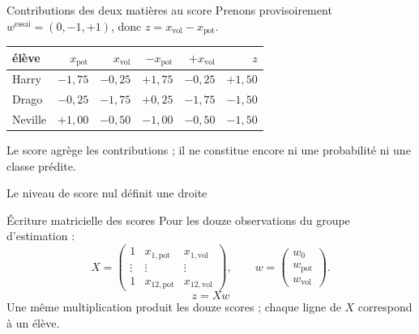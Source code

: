 \begin{frame}[t]{Contributions des deux matières au score}
  \centering
  Prenons provisoirement \(w^{\mathrm{essai}}=(0,-1,+1)\), donc
  \(z=x_{\mathrm{vol}}-x_{\mathrm{pot}}\).
  \vspace{3mm}
  \renewcommand{\arraystretch}{1.25}
  \begin{tabular}{lrrrrr}
    \toprule
    élève & $x_{\mathrm{pot}}$ & $x_{\mathrm{vol}}$ &
      $-x_{\mathrm{pot}}$ & $+x_{\mathrm{vol}}$ & $z$\\
    \midrule
    Harry   & $-1{,}75$ & $-0{,}25$ & $+1{,}75$ & $-0{,}25$ & $+1{,}50$\\
    Drago   & $-0{,}25$ & $-1{,}75$ & $+0{,}25$ & $-1{,}75$ & $-1{,}50$\\
    Neville & $+1{,}00$ & $-0{,}50$ & $-1{,}00$ & $-0{,}50$ & $-1{,}50$\\
    \bottomrule
  \end{tabular}
  \vfill
  Le score agrège les contributions ; il ne constitue encore ni une
  probabilité ni une classe prédite.
\end{frame}

\begin{frame}[t]{Le niveau de score nul définit une droite}
  \centering
\end{frame}

\begin{frame}[t]{Écriture matricielle des scores}
  Pour les douze observations du groupe d'estimation :
  \[
    X=
    \begin{pmatrix}
      1 & x_{1,\mathrm{pot}} & x_{1,\mathrm{vol}}\\
      \vdots & \vdots & \vdots\\
      1 & x_{12,\mathrm{pot}} & x_{12,\mathrm{vol}}
    \end{pmatrix},
    \qquad
    w=\begin{pmatrix}w_0\\w_{\mathrm{pot}}\\w_{\mathrm{vol}}\end{pmatrix}.
  \]
  \[
    \boxed{z=Xw}
  \]
  \vfill
  Une même multiplication produit les douze scores ; chaque ligne de \(X\)
  correspond à un élève.
\end{frame}

